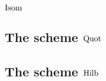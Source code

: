     \subsection{\texorpdfstring{$\mathrm{Isom}$}{}}

    \subsection{The scheme \texorpdfstring{$\mathrm{Quot}$}{}}

    \subsection{The scheme \texorpdfstring{$\mathrm{Hilb}$}{}}
